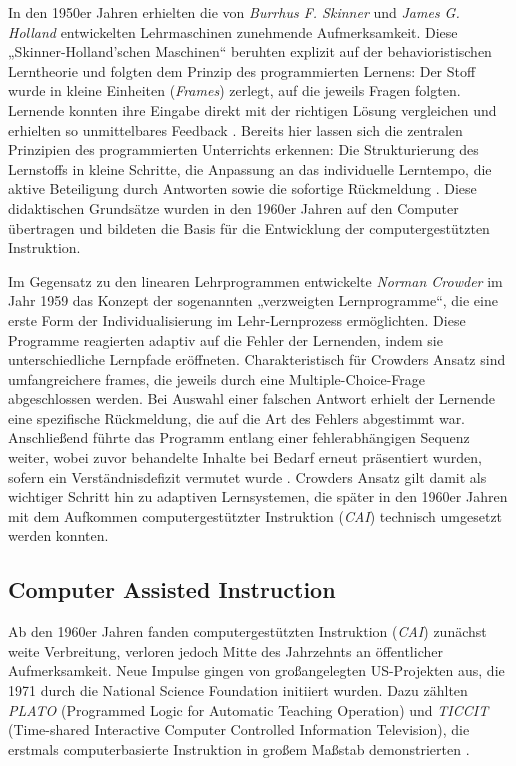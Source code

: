 In den 1950er Jahren erhielten die von \textit{Burrhus F. Skinner} und \textit{James G. Holland} entwickelten Lehrmaschinen zunehmende Aufmerksamkeit. Diese „Skinner-Holland’schen Maschinen“ beruhten explizit auf der behavioristischen Lerntheorie und folgten dem Prinzip des programmierten Lernens: Der Stoff wurde in kleine Einheiten (\textit{Frames}) zerlegt, auf die jeweils Fragen folgten. Lernende konnten ihre Eingabe direkt mit der richtigen Lösung vergleichen und erhielten so unmittelbares Feedback \parencite[S.~970ff]{skinner_teaching_1958}. Bereits hier lassen sich die zentralen Prinzipien des programmierten Unterrichts erkennen: Die Strukturierung des Lernstoffs in kleine Schritte, die Anpassung an das individuelle Lerntempo, die aktive Beteiligung durch Antworten sowie die sofortige Rückmeldung \parencite[S.~1971]{bruillard_teaching_2020}. Diese didaktischen Grundsätze wurden in den 1960er Jahren auf den Computer übertragen und bildeten die Basis für die Entwicklung der computergestützten Instruktion.

Im Gegensatz zu den linearen Lehrprogrammen entwickelte \textit{Norman Crowder} im Jahr 1959 das Konzept der sogenannten „verzweigten Lernprogramme“, die eine erste Form der Individualisierung im Lehr-Lernprozess ermöglichten. Diese Programme reagierten adaptiv auf die Fehler der Lernenden, indem sie unterschiedliche Lernpfade eröffneten. Charakteristisch für Crowders Ansatz sind umfangreichere frames, die jeweils durch eine Multiple-Choice-Frage abgeschlossen werden. Bei Auswahl einer falschen Antwort erhielt der Lernende eine spezifische Rückmeldung, die auf die Art des Fehlers abgestimmt war. Anschließend führte das Programm entlang einer fehlerabhängigen Sequenz weiter, wobei zuvor behandelte Inhalte bei Bedarf erneut präsentiert wurden, sofern ein Verständnisdefizit vermutet wurde \parencites[S.~252ff]{crowder_differences_1963}[S.~9]{schonfeld_computerbasiertes_2006}. Crowders Ansatz gilt damit als wichtiger Schritt hin zu adaptiven Lernsystemen, die später in den 1960er Jahren mit dem Aufkommen computergestützter Instruktion (\textit{\ac{CAI}}) technisch umgesetzt werden konnten.

\subsection{Computer Assisted Instruction}

 Ab den 1960er Jahren fanden computergestützten Instruktion (\textit{\ac{CAI}}) zunächst weite Verbreitung, verloren jedoch Mitte des Jahrzehnts an öffentlicher Aufmerksamkeit. Neue Impulse gingen von großangelegten US-Projekten aus, die 1971 durch die National Science Foundation initiiert wurden. Dazu zählten \textit{PLATO} (Programmed Logic for Automatic Teaching Operation) und \textit{TICCIT} (Time-shared Interactive Computer Controlled Information Television), die erstmals computerbasierte Instruktion in großem Maßstab demonstrierten \parencites[S.~7]{niegemann_kompendium_2008}[S.~69ff]{oshea_lernen_1986}.

